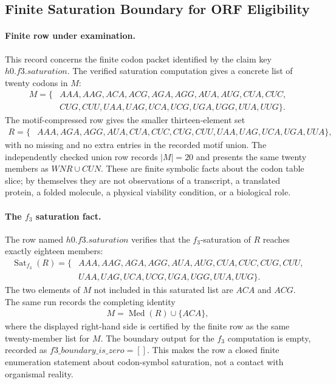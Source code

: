 \subsection{Finite Saturation Boundary for ORF Eligibility}\label{sec:h0-f3-saturation-orf-boundary}

\paragraph{Finite row under examination.}
This record concerns the finite codon packet identified by the claim key $h0.f3.saturation$.  The verified saturation computation gives a concrete list of twenty codons in $M$:
$$
\begin{aligned}
M=\{&AAA,AAG,ACA,ACG,AGA,AGG,AUA,AUG,CUA,CUC,\nonumber\\
& CUG,CUU,UAA,UAG,UCA,UCG,UGA,UGG,UUA,UUG\}.
\end{aligned}
$$
The motif-compressed row gives the smaller thirteen-element set
$$
\begin{aligned}
R=\{&AAA,AGA,AGG,AUA,CUA,CUC,CUG,CUU,UAA,UAG,UCA,UGA,UUA\},
\end{aligned}
$$
with no missing and no extra entries in the recorded motif union.  The independently checked union row records $|M|=20$ and presents the same twenty members as $WNR\cup CUN$.  These are finite symbolic facts about the codon table slice; by themselves they are not observations of a transcript, a translated protein, a folded molecule, a physical viability condition, or a biological role.

\paragraph{The $f_3$ saturation fact.}
The row named $h0.f3.saturation$ verifies that the $f_3$-saturation of $R$ reaches exactly eighteen members:
$$
\begin{aligned}
\operatorname{Sat}_{f_3}(R)=\{&AAA,AAG,AGA,AGG,AUA,AUG,CUA,CUC,CUG,CUU,\nonumber\\
&UAA,UAG,UCA,UCG,UGA,UGG,UUA,UUG\}.
\end{aligned}
$$
The two elements of $M$ not included in this saturated list are $ACA$ and $ACG$.  The same run records the completing identity
$$
\begin{aligned}
M=\operatorname{Med}(R)\cup\{ACA\},
\end{aligned}
$$
where the displayed right-hand side is certified by the finite row as the same twenty-member list for $M$.  The boundary output for the $f_3$ computation is empty, recorded as $f3\_boundary\_is\_zero=[]$.  This makes the row a closed finite enumeration statement about codon-symbol saturation, not a contact with organismal reality.

